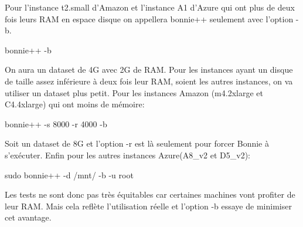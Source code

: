 \documentclass[11pt]{article}
\begin{document}
	Pour l'instance t2.small d'Amazon et l'instance A1 d'Azure qui ont plus
	de deux fois leurs RAM en espace disque on appellera bonnie++ seulement
	avec l'option -b.
	\begin{center}
		bonnie++ -b
	\end{center}
	On aura un dataset de 4G avec 2G de RAM.
	Pour les instances ayant un disque de taille assez inférieure à deux fois leur RAM,
	soient les autres instances, on va utiliser un dataset plus petit.
	Pour les instances Amazon (m4.2xlarge et C4.4xlarge) qui ont moins de mémoire:
	\begin{center}
		bonnie++ -s 8000 -r 4000 -b
	\end{center}
	Soit un dataset de 8G et l'option -r est là seulement pour forcer Bonnie à s'exécuter.
	Enfin pour les autres instances Azure(A8\_v2 et D5\_v2):
	\begin{center}
		sudo bonnie++ -d /mnt/ -b -u root
	\end{center}

	Les tests ne sont donc pas très équitables car certaines machines vont
	profiter de leur RAM. Mais cela reflète l'utilisation réelle et
	l'option -b essaye de minimiser cet avantage. \\
\end{document}
